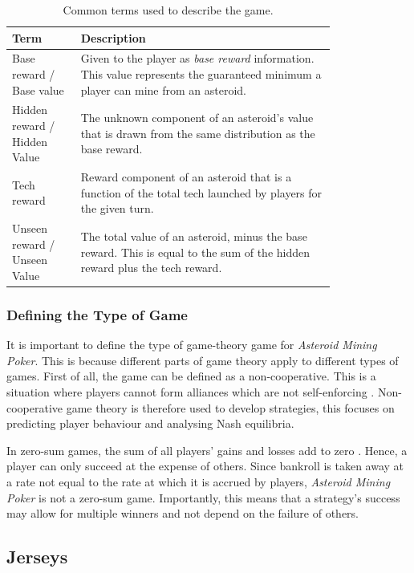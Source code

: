 \documentclass[11pt, twoside]{article}
\begin{document}
\begin{table}[t!]
	\centering
	\caption{Common terms used to describe the game.}
	\label{tab:terms}
	\begin{tabular}{p{0.17\linewidth}>{\raggedright\arraybackslash}p{0.63\linewidth}}
		\toprule
		\textbf{Term} & \textbf{Description} \\
		\midrule
		Base reward / Base value & Given to the player as \textit{base reward} information. This value represents the guaranteed minimum a player can mine from an asteroid.\\
		Hidden reward / Hidden Value & The unknown component of an asteroid's value that is drawn from the same distribution as the base reward. \\
		Tech reward & Reward component of an asteroid that is a function of the total tech launched by players for the given turn.\\
		Unseen reward / Unseen Value & The total value of an asteroid, minus the base reward. This is equal to the sum of the hidden reward plus the tech reward.\\
		\bottomrule
	\end{tabular}
\end{table}

\subsubsection*{Defining the Type of Game}
It is important to define the type of game-theory game for \textit{Asteroid Mining Poker}. This is because different parts of game theory apply to different types of games. First of all, the game can be defined as a non-cooperative. This is a situation where players cannot form alliances which are not self-enforcing \cite{coopGame}. Non-cooperative game theory is therefore used to develop strategies, this focuses on predicting player behaviour and analysing Nash equilibria.

In zero-sum games, the sum of all players' gains and losses add to zero \cite{nash1951non}. Hence, a player can only succeed at the expense of others. Since bankroll is taken away at a rate not equal to the rate at which it is accrued by players, \textit{Asteroid Mining Poker} is not a zero-sum game. Importantly, this means that a strategy's success may allow for multiple winners and not depend on the failure of others.

\subsection*{Jerseys}
\end{document}
